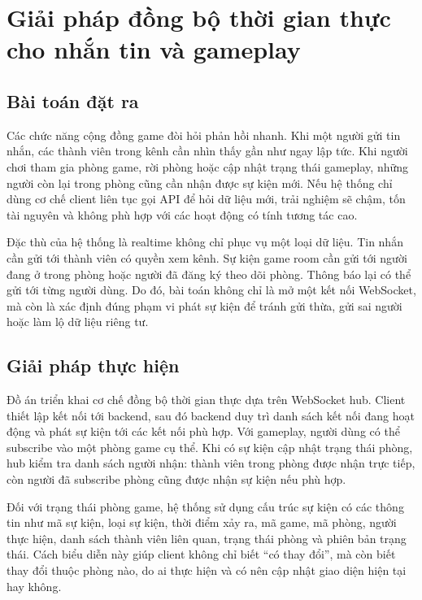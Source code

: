 \section{Giải pháp đồng bộ thời gian thực cho nhắn tin và gameplay}
\label{section:5.3}

\subsection{Bài toán đặt ra}
\label{subsection:5.3.1}

Các chức năng cộng đồng game đòi hỏi phản hồi nhanh. Khi một người gửi tin nhắn, các thành viên trong kênh cần nhìn thấy gần như ngay lập tức. Khi người chơi tham gia phòng game, rời phòng hoặc cập nhật trạng thái gameplay, những người còn lại trong phòng cũng cần nhận được sự kiện mới. Nếu hệ thống chỉ dùng cơ chế client liên tục gọi API để hỏi dữ liệu mới, trải nghiệm sẽ chậm, tốn tài nguyên và không phù hợp với các hoạt động có tính tương tác cao.

Đặc thù của hệ thống là realtime không chỉ phục vụ một loại dữ liệu. Tin nhắn cần gửi tới thành viên có quyền xem kênh. Sự kiện game room cần gửi tới người đang ở trong phòng hoặc người đã đăng ký theo dõi phòng. Thông báo lại có thể gửi tới từng người dùng. Do đó, bài toán không chỉ là mở một kết nối WebSocket, mà còn là xác định đúng phạm vi phát sự kiện để tránh gửi thừa, gửi sai người hoặc làm lộ dữ liệu riêng tư.

\subsection{Giải pháp thực hiện}
\label{subsection:5.3.2}

Đồ án triển khai cơ chế đồng bộ thời gian thực dựa trên WebSocket hub. Client thiết lập kết nối tới backend, sau đó backend duy trì danh sách kết nối đang hoạt động và phát sự kiện tới các kết nối phù hợp. Với gameplay, người dùng có thể subscribe vào một phòng game cụ thể. Khi có sự kiện cập nhật trạng thái phòng, hub kiểm tra danh sách người nhận: thành viên trong phòng được nhận trực tiếp, còn người đã subscribe phòng cũng được nhận sự kiện nếu phù hợp.

Đối với trạng thái phòng game, hệ thống sử dụng cấu trúc sự kiện có các thông tin như mã sự kiện, loại sự kiện, thời điểm xảy ra, mã game, mã phòng, người thực hiện, danh sách thành viên liên quan, trạng thái phòng và phiên bản trạng thái. Cách biểu diễn này giúp client không chỉ biết “có thay đổi”, mà còn biết thay đổi thuộc phòng nào, do ai thực hiện và có nên cập nhật giao diện hiện tại hay không.

